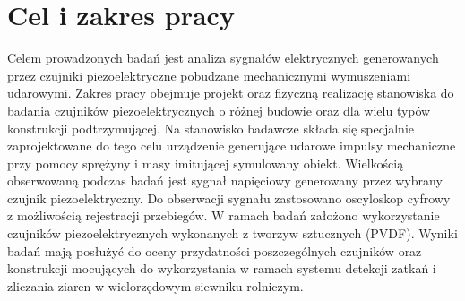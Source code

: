 \documentclass[
12pt, %
oneside, %
polish, %
onehalfspacing, %
headsepline, %
chapterinoneline, %
]{MastersDoctoralThesis} %
\begin{document}







\pagestyle{thesis} %




\chapter{Cel i zakres pracy}
\label{sec:goal_thesis}

Celem prowadzonych badań jest analiza sygnałów elektrycznych generowanych przez czujniki 
piezoelektryczne pobudzane mechanicznymi wymuszeniami udarowymi. Zakres pracy obejmuje 
projekt oraz fizyczną realizację stanowiska do badania czujników piezoelektrycznych o 
różnej budowie oraz dla wielu typów konstrukcji podtrzymującej. Na stanowisko badawcze 
składa się specjalnie zaprojektowane do tego celu urządzenie generujące udarowe impulsy 
mechaniczne przy pomocy sprężyny i masy imitującej symulowany obiekt. Wielkością 
obserwowaną podczas badań jest sygnał napięciowy generowany przez wybrany czujnik 
piezoelektryczny. Do obserwacji sygnału zastosowano oscyloskop cyfrowy z możliwością 
rejestracji przebiegów. W ramach badań założono wykorzystanie czujników 
piezoelektrycznych wykonanych z tworzyw sztucznych (PVDF). Wyniki badań mają posłużyć 
do oceny przydatności poszczególnych czujników oraz konstrukcji mocujących do 
wykorzystania w ramach systemu detekcji zatkań i zliczania ziaren w wielorzędowym 
siewniku rolniczym.
\end{document}
